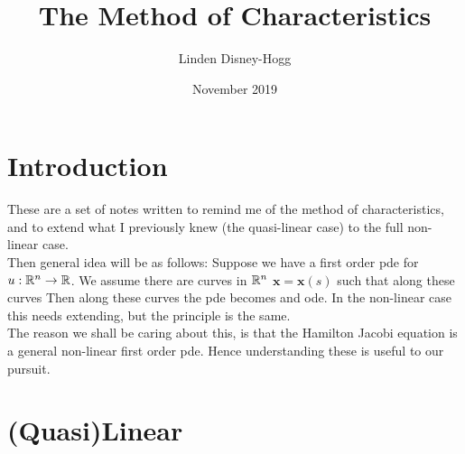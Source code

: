 \documentclass{article}
\title{The Method of Characteristics }
\author{Linden Disney-Hogg}
\date{November 2019}
\begin{document}
\maketitle

\section{Introduction}
These are a set of notes written to remind me of the method of characteristics, and to extend what I previously knew (the quasi-linear case) to the full non-linear case. \\
Then general idea will be as follows: Suppose we have a first order pde for $u:\mathbb{R}^n \to \mathbb{R}$. We assume there are curves in $\mathbb{R}^n$ $\bm{x} = \bm{x}(s)$ such that along these curves
Then along these curves the pde becomes and ode. In the non-linear case this needs extending, but the principle is the same. \\
The reason we shall be caring about this, is that the Hamilton Jacobi equation is a general non-linear first order pde. Hence understanding these is useful to our pursuit. 
\section{(Quasi)Linear}
\end{document}
